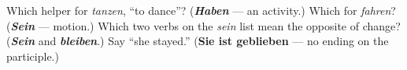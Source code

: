 \begin{tcolorbox}[breakable,colback=teal!4,colframe=teal!35!black,title={Before you move on}]
Which helper for \emph{tanzen}, \textquotedblleft{}to dance\textquotedblright{}? (\emph{\textbf{Haben}} — an activity.) Which for \emph{fahren}? (\emph{\textbf{Sein}} — motion.) Which two verbs on the \emph{sein} list mean the opposite of change? (\emph{\textbf{Sein}} and \emph{\textbf{bleiben}}.) Say \textquotedblleft{}she stayed.\textquotedblright{} (\textbf{Sie ist geblieben} — no ending on the participle.)
\end{tcolorbox}
